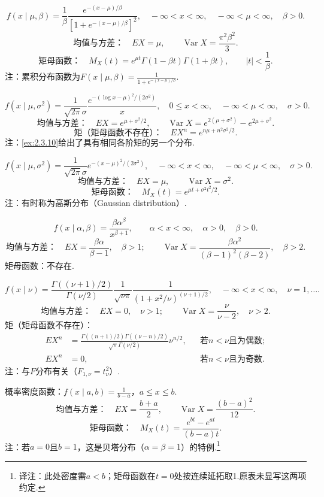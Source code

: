 $$f(x\mid\mu,\beta)=\frac1\beta\frac{e^{-(x-\mu)/\beta}}{[1+e^{-(x-\mu)/\beta}]^2},\quad-\infty<x<\infty,\quad-\infty<\mu<\infty,\quad\beta>0.$$
$$\text{均值与方差：}\quad EX=\mu,\qquad\operatorname{Var}X=\frac{\pi^2\beta^2}{3}.$$
$$\text{矩母函数：}\quad M_X(t)=e^{\mu t}\Gamma(1-\beta t)\Gamma(1+\beta t),\qquad |t|<\frac1\beta.$$
注：累积分布函数为$F(x\mid\mu,\beta)=\frac1{1+e^{-(x-\mu)/\beta}}$.

$$f(x\mid\mu,\sigma^2)=\frac1{\sqrt{2\pi}\sigma}\frac{e^{-(\log x-\mu)^2/(2\sigma^2)}}x,\quad0\le x<\infty,\quad-\infty<\mu<\infty,\quad\sigma>0.$$
$$\text{均值与方差：}\quad EX=e^{\mu+\sigma^2/2},\qquad\operatorname{Var}X=e^{2(\mu+\sigma^2)}-e^{2\mu+\sigma^2}.$$
$$\text{矩（矩母函数不存在）：}\quad EX^n=e^{n\mu+n^2\sigma^2/2}.$$
注：\autoref{ex:2.3.10}给出了具有相同各阶矩的另一个分布.

$$f(x\mid\mu,\sigma^2)=\frac1{\sqrt{2\pi}\sigma}e^{-(x-\mu)^2/(2\sigma^2)},\quad-\infty<x<\infty,\quad-\infty<\mu<\infty,\quad\sigma>0.$$
$$\text{均值与方差：}\quad EX=\mu,\qquad\operatorname{Var}X=\sigma^2.$$
$$\text{矩母函数：}\quad M_X(t)=e^{\mu t+\sigma^2t^2/2}.$$
注：有时称为高斯分布（Gaussian distribution）.

$$f(x\mid\alpha,\beta)=\frac{\beta\alpha^\beta}{x^{\beta+1}},\qquad\alpha<x<\infty,\quad\alpha>0,\quad\beta>0.$$
$$\text{均值与方差：}\quad EX=\frac{\beta\alpha}{\beta-1},\quad\beta>1;\qquad\operatorname{Var}X=\frac{\beta\alpha^2}{(\beta-1)^2(\beta-2)},\quad\beta>2.$$
矩母函数：不存在.

$$f(x\mid\nu)=\frac{\Gamma((\nu+1)/2)}{\Gamma(\nu/2)}\frac1{\sqrt{\nu\pi}}\frac1{(1+x^2/\nu)^{(\nu+1)/2}},\quad-\infty<x<\infty,\quad\nu=1,\ldots.$$
$$\text{均值与方差：}\quad EX=0,\quad\nu>1;\qquad\operatorname{Var}X=\frac\nu{\nu-2},\quad\nu>2.$$
矩（矩母函数不存在）：
\begin{equation*}\begin{aligned}
EX^n&=\frac{\Gamma((n+1)/2)\Gamma((\nu-n)/2)}{\sqrt\pi\Gamma(\nu/2)}\nu^{n/2},&&\text{若$n<\nu$且为偶数};\\
EX^n&=0,&&\text{若$n<\nu$且为奇数}.
\end{aligned}\end{equation*}
注：与$F$分布有关（$F_{1,\nu}=t_\nu^2$）.

概率密度函数：$f(x\mid a,b)=\frac1{b-a}$，$a\le x\le b$.
$$\text{均值与方差：}\quad EX=\frac{b+a}{2},\qquad\operatorname{Var}X=\frac{(b-a)^2}{12}.$$
$$\text{矩母函数：}\quad M_X(t)=\frac{e^{bt}-e^{at}}{(b-a)t}.$$
注：若$a=0$且$b=1$，这是贝塔分布（$\alpha=\beta=1$）的特例.\footnote{译注：此处密度需$a<b$；矩母函数在$t=0$处按连续延拓取1.原表未显写这两项约定.}

